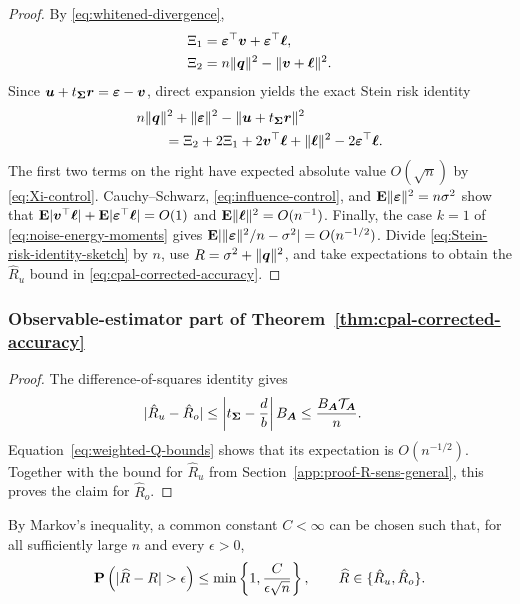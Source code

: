 \documentclass{article}
\theoremstyle{plain} %
\theoremstyle{definition} %
\theoremstyle{definition} %
\newcommand{\hR}{\hat{R}}
\begin{document}
\begin{proof}
By \eqref{eq:whitened-divergence},
\begin{align*}
    \Xi_1&={\boldsymbol{\varepsilon} }^\top\boldsymbol{v}+{\boldsymbol{\varepsilon} }^\top\boldsymbol{\ell},\\
    \Xi_2&=n\lVert\boldsymbol{q}\rVert^2-\lVert\boldsymbol{v}+\boldsymbol{\ell}\rVert^2.
\end{align*}
Since $\boldsymbol{u}+t_{\boldsymbol{\Sigma}}\boldsymbol{r}={\boldsymbol{\varepsilon} }-\boldsymbol{v}$, direct expansion yields the exact Stein
risk identity
\begin{align}
    &n\lVert\boldsymbol{q}\rVert^2+\lVert{\boldsymbol{\varepsilon} }\rVert^2-\lVert\boldsymbol{u}+t_{\boldsymbol{\Sigma}}\boldsymbol{r}\rVert^2\notag\\
    &\qquad=
    \Xi_2+2\Xi_1+2\boldsymbol{v}^\top\boldsymbol{\ell}+\lVert\boldsymbol{\ell}\rVert^2
    -2{\boldsymbol{\varepsilon} }^\top\boldsymbol{\ell}.
    \label{eq:Stein-risk-identity-sketch}
\end{align}
The first two terms on the right have expected absolute value $O(\sqrt n)$ by
\eqref{eq:Xi-control}.  Cauchy--Schwarz,
\eqref{eq:influence-control}, and
${\mathbf{E}}\lVert{\boldsymbol{\varepsilon} }\rVert^2=n\sigma^2$ show that
${\mathbf{E}}|\boldsymbol{v}^\top\boldsymbol{\ell}|+{\mathbf{E}}|{\boldsymbol{\varepsilon} }^\top\boldsymbol{\ell}|=O(1)$ and
${\mathbf{E}}\lVert\boldsymbol{\ell}\rVert^2=O(n^{-1})$.  Finally, the case $k=1$ of
\eqref{eq:noise-energy-moments} gives
${\mathbf{E}}|\lVert{\boldsymbol{\varepsilon} }\rVert^2/n-\sigma^2|=O(n^{-1/2})$.
Divide \eqref{eq:Stein-risk-identity-sketch} by $n$, use
$R=\sigma^2+\lVert\boldsymbol{q}\rVert^2$, and take expectations to obtain
the $\hR_u$ bound in \eqref{eq:cpal-corrected-accuracy}.
\end{proof}

\subsubsection{Observable-estimator part of Theorem~\ref{thm:cpal-corrected-accuracy}}
\label{app:proof-R-obs-general}

\begin{proof}
The difference-of-squares identity gives
\begin{align*}
    |\hR_u-\hR_o|
    &\leq
    \left|t_{\bSigma}-\frac{d}{b}\right|B_{\bA}
    \leq \frac{B_{\bA}\mathcal T_{\bA}}{n}.
\end{align*}
Equation~\eqref{eq:weighted-Q-bounds} shows that its expectation is
$O(n^{-1/2})$. Together with the bound for $\hR_u$ from
Section~\ref{app:proof-R-sens-general}, this proves the claim for $\hR_o$.
\end{proof}

By Markov's inequality, a common constant $C<\infty$ can be chosen
such that, for all sufficiently large $n$ and every $\epsilon>0$,
\begin{align*}
    \P\left(|\widehat R-R|>\epsilon\right)
    \leq\min\left\{1,\frac{C}{\epsilon\sqrt n}\right\},
    \qquad
    \widehat R\in\{\hR_u,\hR_o\}.
\end{align*}
\end{document}
